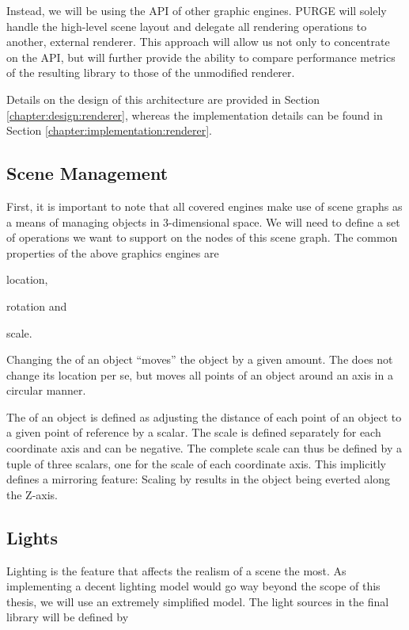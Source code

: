 		Instead, we will be using the API of other graphic engines. PURGE will solely handle the high-level scene layout and delegate all rendering operations to another, external renderer. This approach will allow us not only to concentrate on the API, but will further provide the ability to compare performance metrics of the resulting library to those of the unmodified renderer.

		Details on the design of this architecture are provided in Section \ref{chapter:design:renderer}, whereas the implementation details can be found in Section \ref{chapter:implementation:renderer}.

	\subsection{Scene Management}

		First, it is important to note that all covered engines make use of scene graphs as a means of managing objects in 3-dimensional space. We will need to define a set of operations we want to support on the nodes of this scene graph. The common properties of the above graphics engines are

		\begin{smalllist}
			\item location,
			\item rotation and
			\item scale.
		\end{smalllist}
		
		Changing the  of an object ``moves'' the object by a given amount. The  does not change its location per se, but moves all points of an object around an axis in a circular manner.

		The  of an object is defined as adjusting the distance of each point of an object to a given point of reference by a scalar. The scale is defined separately for each coordinate axis and can be negative. The complete scale can thus be defined by a tuple of three scalars, one for the scale of each coordinate axis. This implicitly defines a mirroring feature: Scaling by  results in the object being everted along the Z-axis.

	\subsection{Lights}

		Lighting is the feature that affects the realism of a scene the most. As implementing a decent lighting model would go way beyond the scope of this thesis, we will use an extremely simplified model. The light sources in the final library will be defined by

